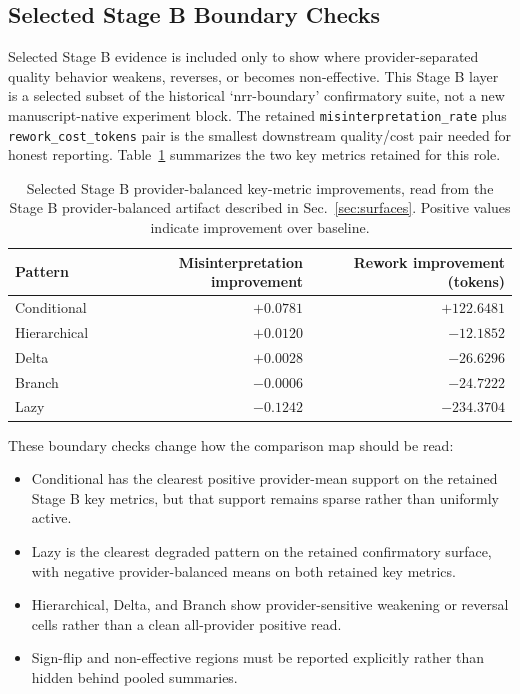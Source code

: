 \documentclass[11pt,a4paper]{article}
\begin{document}
\subsection{Selected Stage B Boundary Checks}

Selected Stage B evidence is included only to show where provider-separated
quality behavior weakens, reverses, or becomes non-effective. This Stage B
layer is a selected subset of the historical `nrr-boundary' confirmatory
suite, not a new manuscript-native experiment block. The retained
\texttt{misinterpretation\_rate} plus \texttt{rework\_cost\_tokens} pair is
the smallest downstream quality/cost pair needed for honest reporting.
Table~\ref{tab:stageb_selected_nrr_patterns} summarizes the two key metrics
retained for this role.

\begin{table}[t]
\centering
\small
\begin{tabular}{lrr}
\toprule
\textbf{Pattern} & \textbf{Misinterpretation improvement} & \textbf{Rework improvement (tokens)} \\
\midrule
Conditional & \(+0.0781\) & \(+122.6481\) \\
Hierarchical & \(+0.0120\) & \(-12.1852\) \\
Delta & \(+0.0028\) & \(-26.6296\) \\
Branch & \(-0.0006\) & \(-24.7222\) \\
Lazy & \(-0.1242\) & \(-234.3704\) \\
\bottomrule
\end{tabular}
\caption{Selected Stage B provider-balanced key-metric improvements, read from the Stage B provider-balanced artifact described in Sec.~\ref{sec:surfaces}. Positive values indicate improvement over baseline.}
\label{tab:stageb_selected_nrr_patterns}
\end{table}

These boundary checks change how the comparison map should be read:
\begin{itemize}
  \item Conditional has the clearest positive provider-mean support on the retained Stage B key metrics, but that support remains sparse rather than uniformly active.
  \item Lazy is the clearest degraded pattern on the retained confirmatory surface, with negative provider-balanced means on both retained key metrics.
  \item Hierarchical, Delta, and Branch show provider-sensitive weakening or reversal cells rather than a clean all-provider positive read.
  \item Sign-flip and non-effective regions must be reported explicitly rather than hidden behind pooled summaries.
\end{itemize}
\end{document}
